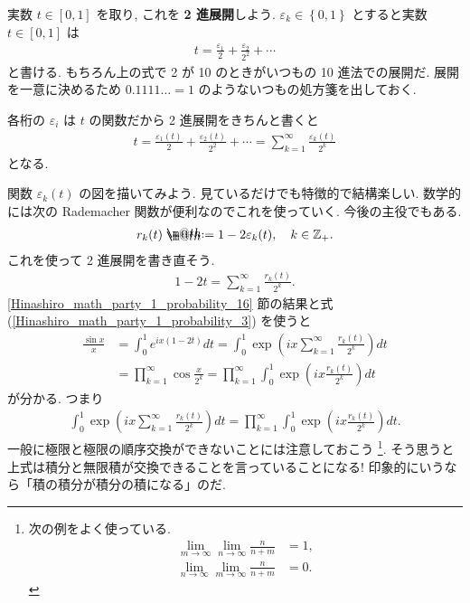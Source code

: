 \documentclass[openany, a4paper, oneside]{book}
\makeatletter
\newcommand*{\defeq}{\mathrel{\rlap{%
\raisebox{0.3ex}{$\m@th\cdot$}}%
\raisebox{-0.3ex}{$\m@th\cdot$}}%
=}
\theoremstyle{break}
\theoremstyle{breakdefn}
\newcommand{\rbk}[1]{\left (#1\right)}
\newcommand{\sqbk}[1]{\left[#1\right]}
\newcommand{\cbk}[1]{\left\{#1\right\}}
\newcommand{\bbZ}{\mathbb{Z}}
\newcommand{\limntoinfty}{\lim_{n \to \infty}}
\makeatother
\begin{document}
実数 $t \in \sqbk{0, 1}$ を取り, これを \textbf{2 進展開}しよう.
$\varepsilon_k \in \cbk{0, 1}$ とすると実数 $t \in \sqbk{0, 1}$ は
\begin{align}
 t
 =
 \frac{\varepsilon_1}{2} + \frac{\varepsilon_2}{2^2} + \cdots
\end{align}
と書ける.
もちろん上の式で 2 が 10 のときがいつもの 10 進法での展開だ.
展開を一意に決めるため $0.1111 \dots = 1$ のようないつもの処方箋を出しておく.

各桁の $\varepsilon_i$ は $t$ の関数だから 2 進展開をきちんと書くと
\begin{align}
 t
 =
 \frac{\varepsilon_1 (t)}{2} + \frac{\varepsilon_2 (t)}{2^2} + \cdots
 =
 \sum_{k=1}^{\infty} \frac{\varepsilon_k (t)}{2^k}
\end{align}
となる.

関数 $\varepsilon_k (t)$ の図を描いてみよう.
見ているだけでも特徴的で結構楽しい.
数学的には次の Rademacher 関数が便利なのでこれを使っていく.
今後の主役でもある.
\begin{align}
 r_k (t)
 \defeq
 1 - 2 \varepsilon_k (t), \quad k \in \bbZ_+. \label{Hinashiro_math_party_1_probability_4}
\end{align}
これを使って 2 進展開を書き直そう.
\begin{align}
 1 - 2 t
 =
 \sum_{k=1}^{\infty} \frac{r_k (t)}{2^k}. \label{Hinashiro_math_party_1_probability_19}
\end{align}
\ref{Hinashiro_math_party_1_probability_16} 節の結果と式 (\ref{Hinashiro_math_party_1_probability_3}) を使うと
\begin{align}
 \frac{\sin x}{x}
 &=
 \int_{0}^1 e^{ix (1 - 2t)} dt
 =
 \int_{0}^1 \exp \rbk{ix \sum_{k=1}^{\infty} \frac{r_k (t)}{2^k}} dt \\
 &=
 \prod_{k=1}^{\infty} \cos \frac{x}{2^{k}}
 =
 \prod_{k=1}^{\infty} \int_0^1 \exp \rbk{i x \frac{r_k (t)}{2^k}} dt \label{Hinashiro_math_party_1_probability_5}
\end{align}
が分かる.
つまり
\begin{align}
 \int_{0}^1 \exp \rbk{ix \sum_{k=1}^{\infty} \frac{r_k (t)}{2^k}} dt
 =
 \prod_{k=1}^{\infty} \int_0^1 \exp \rbk{i x \frac{r_k (t)}{2^k}} dt.
\end{align}
一般に極限と極限の順序交換ができないことには注意しておこう \footnote{次の例をよく使っている.
\begin{align}
 \lim_{m \to \infty} \limntoinfty \frac{n}{n+m} &= 1, \\
 \limntoinfty \lim_{m \to \infty} \frac{n}{n+m} &= 0.
\end{align}
 }.
そう思うと上式は積分と無限積が交換できることを言っていることになる!
印象的にいうなら「積の積分が積分の積になる」のだ.
\end{document}
